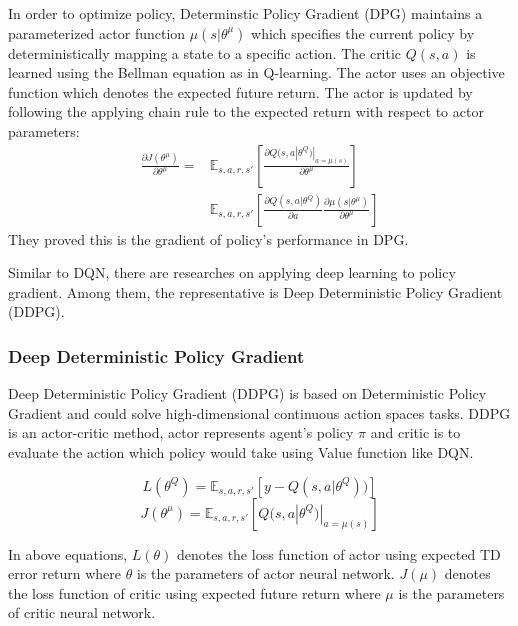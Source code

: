 \documentclass[11pt,twocolumn]{jarticle} %
\begin{document}
In order to optimize policy, Determinstic Policy Gradient (DPG) maintains a parameterized actor function $\mu(s|\theta^\mu)$ which specifies the current policy by deterministically mapping a state to a specific action. The critic $Q(s, a)$ is learned using the Bellman equation as in Q-learning. The actor uses an objective function which denotes the expected future return. The actor is updated by following the applying chain rule to the expected return with respect to actor parameters:
\begin{equation}
\label{dpg_prove}
\begin{split}
\frac{\partial J(\theta^\mu)}{\partial \theta^\mu} = 
& \mathbb{E}_{s,a,r,s'}[\frac{\partial Q(s, a|\theta^Q)|_{a = \mu(s)}}{\partial \theta^\mu}] \\
& \mathbb{E}_{s,a,r,s'}[\frac{\partial Q(s, a|\theta^Q)}{\partial a} \frac{\partial \mu(s|\theta^\mu)}{\partial \theta^\mu}]
\end{split}
\end{equation}
They proved this is the gradient of policy's performance in DPG\cite{dpg}. \par

Similar to DQN, there are researches on applying deep learning to policy gradient. Among them, the representative is Deep Deterministic Policy Gradient (DDPG)\cite{ddpg}. 

\subsubsection{Deep Deterministic Policy Gradient\cite{ddpg}}
Deep Deterministic Policy Gradient (DDPG) is based on Deterministic Policy Gradient\cite{dpg} and could solve high-dimensional continuous action spaces tasks. DDPG is an actor-critic method, actor represents agent's policy $\pi$ and critic is to evaluate the action which policy would take using Value function like DQN. 

\begin{equation}
L(\theta^Q) = \mathbb{E}_{s,a,r,s'}[y - Q(s, a|\theta^Q))] 
\end{equation}
\begin{equation}
J(\theta^\mu) = \mathbb{E}_{s,a,r,s'}[Q(s, a|\theta^Q) | _{a=\mu(s)}]
\end{equation}

In above equations, $L(\theta)$ denotes the loss function of actor using expected TD error return where $\theta$ is the parameters of actor neural network. $J(\mu)$ denotes the loss function of critic using expected future return where $\mu$ is the parameters of critic neural network. \par
\end{document}
